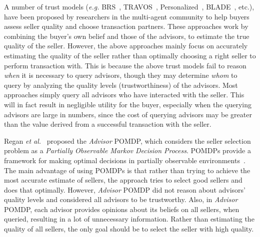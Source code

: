 \documentclass{aamas2014}
\begin{document}
A number of trust models (\textit{e.g.} BRS~\cite{whitby05}, TRAVOS~\cite{teach06}, Personalized~\cite{zhang09thesis}, BLADE~\cite{regan2006bayesian}, etc.), have been proposed by researchers in the multi-agent community to help buyers assess seller quality and choose transaction partners. These approaches work by combining the buyer's own belief and those of the advisors, to estimate the true quality of the seller. However, the above approaches mainly focus on accurately estimating the quality of the seller rather than optimally choosing a right seller to perform transaction with. This is because the above trust models fail to reason \textit{when} it is necessary to query advisors, though they may determine \textit{whom} to query by analyzing the quality levels (trustworthiness) of the advisors. Most approaches simply query all advisors who have interacted with the seller. This will in fact result in negligible utility for the buyer, especially when the querying advisors are large in numbers, since the cost of querying advisors may be greater than the value derived from a successful transaction with the seller.

Regan \textit{et al.}~\cite{regan2005advisor} proposed the \textit{Advisor} POMDP, which considers the seller selection problem as a \textit{Partially Observable Markov Decision Process}. POMDPs provide a framework for making optimal decisions in partially observable environments~\cite{kaelbling1998planning}. The main advantage of using POMDPs is that  rather than trying to achieve the most accurate estimate of sellers, the approach tries to select good sellers and does that optimally. However, \textit{Advisor} POMDP did not reason about advisors' quality levels and considered all advisors to be trustworthy.  Also, in \textit{Advisor} POMDP, each advisor provides opinions about its beliefs on all sellers, when queried, resulting in a lot of unnecessary information. Rather than estimating the quality of all sellers, the only goal should be to select the seller with high quality.
\end{document}
